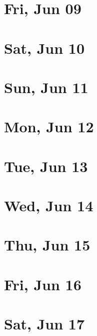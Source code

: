 	\section{Fri, Jun 09}
		
		
	\section{Sat, Jun 10}
		
		
	\section{Sun, Jun 11}
		
		
	\section{Mon, Jun 12}
		
		
	\section{Tue, Jun 13}
		
		
	\section{Wed, Jun 14}
		
		
	\section{Thu, Jun 15}
		
		
	\section{Fri, Jun 16}
		
		
	\section{Sat, Jun 17}
		
		
